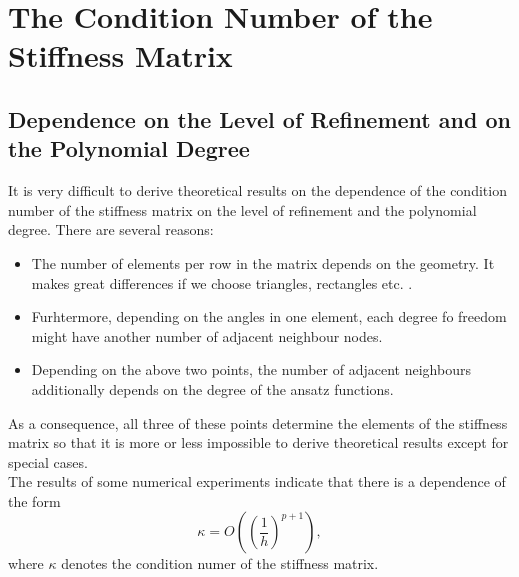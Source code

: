 \documentclass[a4paper, 11pt, twoside]{article}
\begin{document}
\newpage
\section{The Condition Number of the Stiffness Matrix}
\subsection{Dependence on the Level of Refinement and on the Polynomial Degree}
It is very difficult to derive theoretical results on the dependence of the condition number of the stiffness matrix on the level of refinement and the polynomial degree. There are several reasons:
\begin{itemize}
\item The number of elements per row in the matrix depends on the geometry. It makes great differences if we choose triangles, rectangles etc. .
\item Furhtermore, depending on the angles in one element, each degree fo freedom might have another number of adjacent neighbour nodes.
\item Depending on the above two points, the number of adjacent neighbours additionally depends on the degree of the ansatz functions.
\end{itemize}
As a consequence, all three of these points determine the elements of the stiffness matrix so that it is more or less impossible to derive theoretical results except for special cases. \\
The results of some numerical experiments indicate that there is a dependence of the form
\begin{equation*}
\kappa = O \left( \left( \frac{1}{h} \right) ^{p+1} \right),
\end{equation*}
where $\kappa$ denotes the condition numer of the stiffness matrix.
\end{document}
